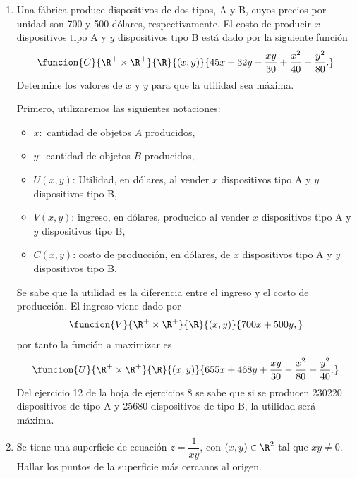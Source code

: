 \documentclass[a4,11pt]{aleph-examen}
\begin{document}
\begin{preguntas}
\begin{respuesta}
\begin{respuesta}
\begin{respuesta}
\begin{enumerate}
\begin{respuesta}
	La función $C$ es la que se quiere optimizar, encontrar el mínimo en este caso. De acuerdo al ejercicio 4 de la hoja de ejercicios 8, la producción de arroz y café, para que el costo de producción sea mínimo, debe ser 1 y 3 toneladas respectivamente.
\end{respuesta}


\item
	Una fábrica produce dispositivos de dos tipos, A y B, cuyos precios por unidad son 700 y 500 dólares, respectivamente. El costo de producir $x$ dispositivos tipo A y $y$ dispositivos tipo B está dado por la siguiente función
	\[
        \funcion{C}{\R^+ \times \R^+ }{\R}{(x,y)}{45x+32y-\frac{xy}{30}+\frac{x^2}{40}+\frac{y^2}{80}.}
    \]
	Determine los valores de $x$ y $y$ para que la utilidad sea máxima.

\begin{respuesta}
    Primero, utilizaremos las siguientes notaciones:
    	\begin{itemize}
    	    \item $x:$ cantidad de objetos $A$ producidos,
    	    \item $y:$ cantidad de objetos $B$ producidos,
        	\item $U(x,y)$: Utilidad, en dólares, al vender $x$ dispositivos tipo A y $y$ dispositivos tipo B,
            \item $V(x,y)$: ingreso, en dólares, producido al vender $x$ dispositivos tipo A y $y$ dispositivos tipo B,
            \item $C(x,y)$: costo de producción, en dólares, de $x$ dispositivos tipo A y $y$ dispositivos tipo B.
        \end{itemize}
    Se sabe que la utilidad es la diferencia entre el ingreso y el costo de producción. El ingreso viene dado por
    \[
        \funcion{V}{\R^+\times \R^+}{\R}{(x,y)}{700x+500y,}
    \]
    por tanto la función a maximizar es
	\[
     \funcion{U}{\R^+\times \R^+}{\R}{(x,y)}{655x+468y+\frac{xy}{30}-\frac{x^2}{80}+\frac{y^2}{40}.}
    \]
    Del ejercicio 12 de la hoja de ejercicios 8 se sabe que si se producen 230220 dispositivos de tipo A y 25680 dispositivos de tipo B, la utilidad será máxima.
\end{respuesta}    

\item
    Se tiene una superficie de ecuación $z=\dfrac{1}{xy}$, con $(x,y) \in \R^2$ tal que $xy\neq 0$. Hallar los puntos de la superficie más cercanos al origen. 


\end{enumerate}
\end{respuesta}
\end{respuesta}
\end{respuesta}
\end{preguntas}
\end{document}
